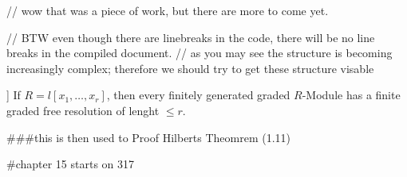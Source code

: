 // wow that was a piece of work, but there are more to come yet.





// BTW even though there are linebreaks in the code, there will be no line breaks in the compiled document.
// as you may see the structure is becoming increasingly complex; therefore we should try to get these structure visable

\begin{thm}[Hilberts syzygy theorem\nocite[Eis1]{1.13} ]
	If \( R = l \left[ x_{1}, \dots ,x_{r} \right] \), 
then every finitely generated graded \( R\)-Module has a finite graded free resolution of lenght \( \le r  \).
\end{thm}

###this is then used to Proof Hilberts Theomrem (1.11) 

#chapter 15 starts on 317



